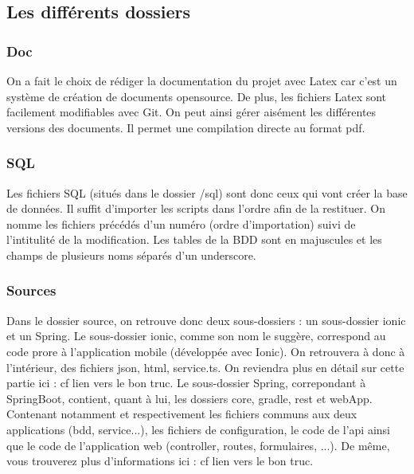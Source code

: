 		\subsection{Les différents dossiers}
			\subsubsection{Doc}
				On a fait le choix de rédiger la documentation du projet avec Latex car c'est un système de création de documents opensource. De plus, les fichiers Latex sont facilement modifiables avec Git. On peut ainsi gérer aisément les différentes versions des documents. Il permet une compilation directe au format pdf.

			\subsubsection{SQL}
				Les fichiers SQL (situés dans le dossier /sql) sont donc ceux qui vont créer la base de données. Il suffit d'importer les scripts dans l'ordre afin de la restituer. On nomme les fichiers précédés d'un numéro (ordre d'importation) suivi de l'intitulité de la modification. Les tables de la BDD sont en majuscules et les champs de plusieurs noms séparés d'un underscore.

			\subsubsection{Sources}
				Dans le dossier source, on retrouve donc deux sous-dossiers : un sous-dossier ionic et un Spring.
				Le sous-dossier ionic, comme son nom le suggère, correspond au code prore à l'application mobile (développée avec Ionic). On retrouvera à donc à l'intérieur, des fichiers json, html, service.ts. On reviendra plus en détail sur cette partie ici : cf lien vers le bon truc.
				Le sous-dossier Spring, correpondant à SpringBoot, contient, quant à lui, les dossiers core, gradle, rest et webApp. Contenant notamment et respectivement les fichiers communs aux deux applications (bdd, service...), les fichiers de configuration, le code de l'api ainsi que le code de l'application web (controller, routes, formulaires, ...).
				De même, vous trouverez plus d'informations ici : cf lien vers le bon truc.

